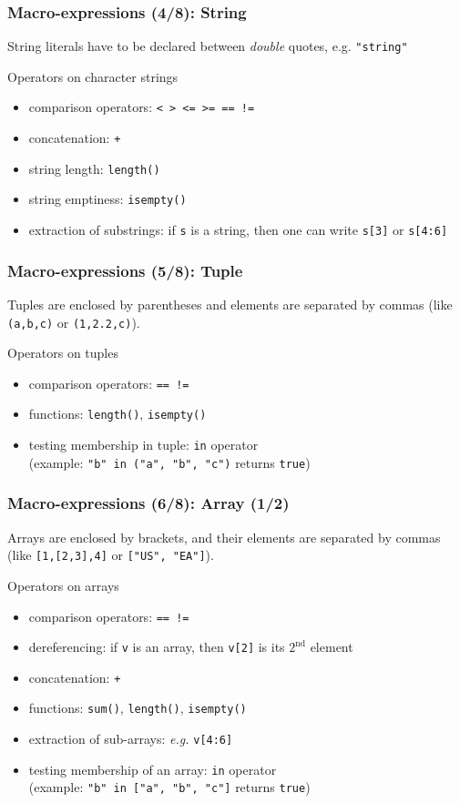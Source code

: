 \documentclass[aspectratio=169]{beamer}
\begin{document}
\begin{frame}[fragile=singleslide]
  \frametitle{Macro-expressions (4/8): String}
  String literals have to be declared between \textit{double} quotes, e.g. \texttt{"string"}
  \begin{block}{Operators on character strings}
    \begin{itemize}
    \item comparison operators: \texttt{< > <= >= == !=}
    \item concatenation: \texttt{+}
    \item string length: \texttt{length()}
    \item string emptiness: \texttt{isempty()}
    \item extraction of substrings: if \texttt{s} is a string, then one can write \texttt{s[3]} or \texttt{s[4:6]}
    \end{itemize}
  \end{block}
\end{frame}

\begin{frame}[fragile=singleslide]
  \frametitle{Macro-expressions (5/8): Tuple}
  Tuples are enclosed by parentheses and elements are separated by commas (like
  \texttt{(a,b,c)} or \texttt{(1,2.2,c)}).
  \begin{block}{Operators on tuples}
    \begin{itemize}
    \item comparison operators: \texttt{== !=}
    \item functions: \texttt{length()}, \texttt{isempty()}
    \item testing membership in tuple: \texttt{in} operator \\ (example:
      \texttt{"b" in ("a", "b", "c")} returns \texttt{true})
    \end{itemize}
  \end{block}
\end{frame}

\begin{frame}[fragile=singleslide]
  \frametitle{Macro-expressions (6/8): Array (1/2)}
  Arrays are enclosed by brackets, and their elements are separated by commas
  (like \texttt{[1,[2,3],4]} or \texttt{["US", "EA"]}).
  \begin{block}{Operators on arrays}
    \begin{itemize}
    \item comparison operators: \texttt{== !=}
    \item dereferencing: if \texttt{v} is an array, then \texttt{v[2]} is its $2^{\textrm{nd}}$ element
    \item concatenation: \texttt{+}
    \item functions: \texttt{sum()}, \texttt{length()}, \texttt{isempty()}
    \item extraction of sub-arrays: \textit{e.g.} \texttt{v[4:6]}
    \item testing membership of an array: \texttt{in} operator \\ (example:
      \texttt{"b" in ["a", "b", "c"]} returns \texttt{true})
    \end{itemize}
  \end{block}
\end{frame}
\end{document}
